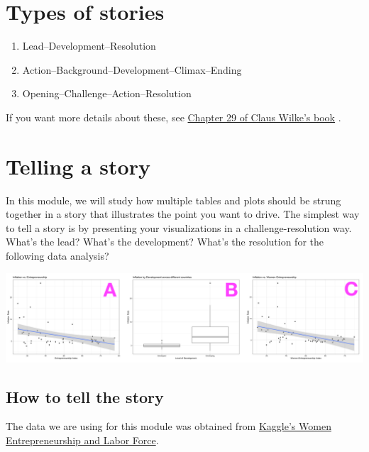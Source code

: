 \documentclass[
]{book}
\providecommand{\tightlist}{%
  \setlength{\itemsep}{0pt}\setlength{\parskip}{0pt}}
\begin{document}
\hypertarget{types-of-stories}{%
\section{Types of stories}\label{types-of-stories}}

\begin{enumerate}
\def\labelenumi{\arabic{enumi}.}
\tightlist
\item
  Lead--Development--Resolution
\item
  Action--Background--Development--Climax--Ending
\item
  Opening--Challenge--Action--Resolution
\end{enumerate}

If you want more details about these, see \href{https://clauswilke.com/dataviz/telling-a-story.html}{Chapter 29 of Claus Wilke's book} \citep{wilke2019fundamentals}.

\hypertarget{telling-a-story}{%
\section{Telling a story}\label{telling-a-story}}

In this module, we will study how multiple tables and plots should be strung together in a story that illustrates the point you want to drive. The simplest way to tell a story is by presenting your visualizations in a challenge-resolution way. What's the lead? What's the development? What's the resolution for the following data analysis?

\includegraphics[width=42.22in]{images/telling_a_story_all}

\hypertarget{how-to-tell-the-story}{%
\subsection{How to tell the story}\label{how-to-tell-the-story}}

The data we are using for this module was obtained from \href{https://www.kaggle.com/babyoda/women-entrepreneurship-and-labor-force}{Kaggle's Women Entrepreneurship and Labor Force}.
\end{document}
